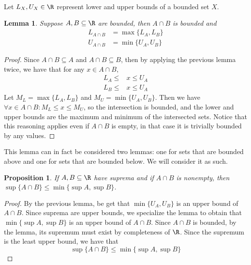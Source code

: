 \documentclass[letterpaper,11pt]{article}
\newtheorem{prop}{Proposition}
\newtheorem{lem}{Lemma}
\newcommand{\intersn}{\cap}
\begin{document}
Let $L_X, U_X \in \R$ represent lower and upper bounds of a bounded set $X$.

\begin{lem}
  Suppose $A, B \subseteq \R$ are bounded,
  then $A \intersn B$ is bounded and
  \begin{align*}
    L_{A \intersn B} &= \max\{L_A, L_B\} \\
    U_{A \intersn B} &= \min\{U_A, U_B\}
  \end{align*}
\end{lem}

\begin{proof}
  Since $A \intersn B \subseteq A$ and $A \intersn B \subseteq B$,
  then by applying the previous lemma twice, we have that for any
  $x \in A \intersn B$,
  \begin{align*}
    L_A \leq &x \leq U_A \\
    L_B \leq &x \leq U_A
  \end{align*}
  Let $M_L = \max \{ L_A, L_B \}$ and $M_U = \min \{ U_A, U_B \}$.
  Then we have $\forall x \in A \intersn B: M_L \leq x \leq M_U$, so the
  intersection is bounded, and the lower and upper bounds are the maximum and
  minimum of the intersected sets.
  Notice that this reasoning applies even if $A \intersn B$ is empty, in that
  case it is trivially bounded by any values.
\end{proof}

This lemma can in fact be considered two lemmas: one for sets that are bounded
above and one for sets that are bounded below. We will consider it as such.

\begin{prop}
  If $A, B \subseteq \R$ have suprema and if $A \intersn B$ is nonempty,
  then $\sup \{ A \intersn B \} \leq \min \{ \sup A, \sup B \}$.
\end{prop}

\begin{proof}
  By the previous lemma, be get that
  $\min \{ U_A, U_B \}$ is an upper bound of $A \intersn B$.
  Since suprema are upper bounds, we specialize the lemma to obtain that
  $\min \{ \sup A, \sup B \}$ is an upper bound of $A \intersn B$.
  Since $A \intersn B$ is bounded, by the lemma, its supremum must exist by
  completeness of $\R$.
  Since the supremum is the least upper bound, we have that
  \begin{equation*}
    \sup \{ A \intersn B \} \leq \min \{ \sup A, \sup B \}
  \end{equation*}
\end{proof}
\end{document}
